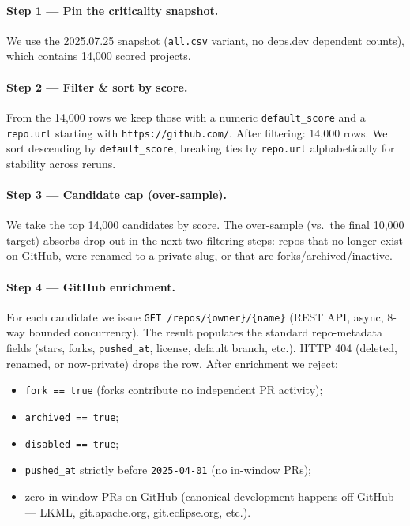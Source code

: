 \paragraph{Step 1 --- Pin the criticality snapshot.} We use the
2025.07.25{} snapshot (\texttt{all.csv} variant, no deps.dev
dependent counts), which contains 14,000{} scored
projects.

\paragraph{Step 2 --- Filter \& sort by score.} From the
14,000{} rows we keep those with a numeric
\texttt{default\_score} and a \texttt{repo.url} starting with
\texttt{https://github.com/}. After filtering: 14,000{}
rows. We sort descending by \texttt{default\_score}, breaking ties by
\texttt{repo.url} alphabetically for stability across reruns.

\paragraph{Step 3 --- Candidate cap (over-sample).} We take the top
14,000{} candidates by score. The over-sample (vs.\ the
final 10,000{} target) absorbs drop-out in the next two
filtering steps: repos that no longer exist on GitHub, were renamed to a
private slug, or that are forks/archived/inactive.

\paragraph{Step 4 --- GitHub enrichment.} For each candidate we issue
\texttt{GET /repos/\{owner\}/\{name\}} (REST API, async, 8-way bounded
concurrency). The result populates the standard repo-metadata fields
(stars, forks, \texttt{pushed\_at}, license, default branch, etc.). HTTP
404 (deleted, renamed, or now-private) drops the row. After enrichment we
reject:
\begin{itemize}
\item \texttt{fork == true} (forks contribute no independent PR activity);
\item \texttt{archived == true};
\item \texttt{disabled == true};
\item \texttt{pushed\_at} strictly before \texttt{2025-04-01} (no
in-window PRs);
\item zero in-window PRs on GitHub (canonical development happens off GitHub --- LKML, git.apache.org, git.eclipse.org, etc.).
\end{itemize}

